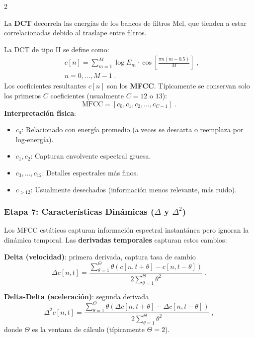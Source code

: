 \documentclass[12pt]{report}
\newenvironment{tightmulticols}{%
  \begin{multicols}{2}
  \setlength{\parskip}{1.2pt}
  \linespread{1}\selectfont
}{%
  \end{multicols}
}
\begin{document}
\begin{tightmulticols}
\noindent La \textbf{DCT} decorrela las energías de los bancos de filtros Mel, que tienden a estar correlacionadas debido al traslape entre filtros.

\par La DCT de tipo II se define como:
\begin{equation*}
    \begin{split}
    &c[n] = \sum_{m=1}^{M} \log E_m \cdot \cos\left[\frac{\pi n (m - 0.5)}{M}\right] \; , \\[0.6ex]
    &n = 0, \ldots, M-1 \; .        
    \end{split}
\end{equation*}
\noindent Los coeficientes resultantes $c[n]$ son los \textbf{MFCC}. Típicamente se conservan solo los primeros $C$ coeficientes (usualmente $C = 12$ o $13$):
\begin{equation*}
    \text{MFCC} = [c_0, c_1, c_2, \ldots, c_{C-1}] \; .
\end{equation*}
\noindent \textbf{Interpretación física}:
\begin{itemize}
    \item $c_0$: Relacionado con energía promedio (a veces se descarta o reemplaza por log-energía).
    \item $c_1, c_2$: Capturan envolvente espectral gruesa.
    \item $c_3, \ldots, c_{12}$: Detalles espectrales más finos.
    \item $c_{>12}$: Usualmente desechados (información menos relevante, más ruido).
\end{itemize}

\subsubsection{Etapa 7: Características Dinámicas ($\Delta$ y $\Delta^2$)}

\noindent Los MFCC estáticos capturan información espectral instantánea pero ignoran la dinámica temporal. Las \textbf{derivadas temporales} capturan estos cambios:

\noindent\textbf{Delta (velocidad)}: primera derivada, captura tasa de cambio
\begin{equation*}
    \Delta c[n, t] = \frac{\sum_{\theta=1}^{\Theta} \theta (c[n, t+\theta] - c[n, t-\theta])}{2\sum_{\theta=1}^{\Theta} \theta^2} \; .
\end{equation*}

\noindent\textbf{Delta-Delta (aceleración)}: segunda derivada
\begin{equation*}
    \Delta^2 c[n, t] = \frac{\sum_{\theta=1}^{\Theta} \theta (\Delta c[n, t+\theta] - \Delta c[n, t-\theta])}{2\sum_{\theta=1}^{\Theta} \theta^2} \; ,
\end{equation*}
\noindent donde $\Theta$ es la ventana de cálculo (típicamente $\Theta = 2$).


\end{tightmulticols}
\end{document}
